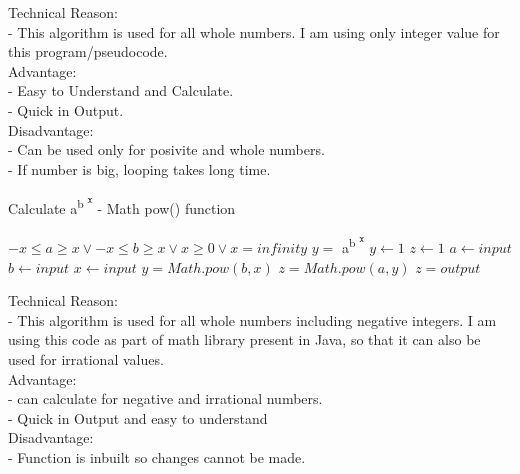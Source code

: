 \documentclass[a4paper,10pt]{article}
\begin{document}
\newline
\indent\indent
{\large{Technical Reason:}\\}
\indent\indent\indent
{\fontsize{12}{16}\selectfont - This algorithm is used for all whole numbers. I am using only integer value for this program/pseudocode.\\}
\newline
\indent\indent
{\large{Advantage:}\\}
\indent\indent\indent
{\fontsize{12}{16}\selectfont - Easy to Understand and Calculate.\\}
\indent\indent\indent
{\fontsize{12}{16}\selectfont - Quick in Output.\\}
\newline
\indent\indent
{\large{Disadvantage:}\\}
\indent\indent\indent
{\fontsize{12}{16}\selectfont - Can be used only for posivite and whole numbers.\\}
\indent\indent\indent
{\fontsize{12}{16}\selectfont - If number is big, looping takes long time.\\}

\begin{algorithm}
\caption{Calculate  a\textsuperscript{b \textsuperscript{x}} - Math pow() function}
\begin{algorithmic} 
\REQUIRE $ -x \leq a \geq x   \vee  -x \leq b \geq x \vee x \geq 0 \vee x = infinity $
\ENSURE $y = $ a\textsuperscript{b \textsuperscript{x}}
\STATE $y \leftarrow 1$
\STATE $z \leftarrow 1$
\STATE $a \leftarrow input$
\STATE $b \leftarrow input$
\STATE $x \leftarrow input$
\STATE $y = Math.pow(b,x)$
\STATE $z = Math.pow(a,y)$
\STATE $z = output$
\end{algorithmic}
\end{algorithm}
\newline
\indent\indent
{\large{Technical Reason:}\\}
\indent\indent\indent
{\fontsize{12}{16}\selectfont - This algorithm is used for all whole numbers including negative integers. I am using this code as part of math library present in Java, so that it can also be used for irrational values.\\}
\newline
\indent\indent
{\large{Advantage:}\\}
\indent\indent\indent
{\fontsize{12}{16}\selectfont - can calculate for negative and irrational numbers.\\}
\indent\indent\indent
{\fontsize{12}{16}\selectfont - Quick in Output and easy to understand\\}
\newline
\indent\indent
{\large{Disadvantage:}\\}
\indent\indent\indent
{\fontsize{12}{16}\selectfont - Function is inbuilt so changes cannot be made.\\}
\end{document}
